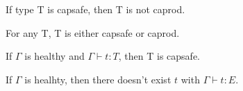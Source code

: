 \begin{lemma}
 If type T is capsafe, then T is not caprod.
\end{lemma}

\begin{lemma}
 For any T, T is either capsafe or caprod.
\end{lemma}



\begin{lemma}
  If $\Gamma$ is healthy and $\Gamma \vdash t : T$, then T is capsafe.
\end{lemma}

\begin{theorem}
  If $\Gamma$ is healhty, then there doesn't exist $t$ with
  $\Gamma \vdash t : E$.
\end{theorem}


